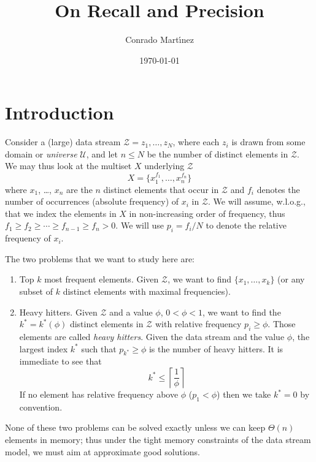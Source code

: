 \documentclass{article}
\title{On Recall and Precision}
\author{Conrado Mart{\'\i}nez} %
\date{\today}
\begin{document}
\maketitle

\section{Introduction}
Consider a (large) data stream $\mathcal{Z}=z_1,\ldots,z_N$, where each $z_i$ is
drawn from some domain or \emph{universe} $\mathcal{U}$, and let $n\le N$ 
be the number of distinct elements in $\mathcal{Z}$. We may thus look at 
the multiset $X$ underlying $\mathcal{Z}$
\[
X = \{x_1^{f_1},\ldots,x_n^{f_n}\}
\]
where $x_1$, \ldots, $x_n$ are the $n$ distinct elements that occur 
in $\mathcal{Z}$ and $f_i$ denotes the number of occurrences (absolute 
frequency) of $x_i$ in $\mathcal{Z}$.
We will assume, w.l.o.g., 
that we index the elements in $X$ in non-increasing order
of frequency, thus $f_1\ge f_2 \ge \cdots \ge f_{n-1} \ge f_n > 0$.
We will use $p_i = f_i/N$ to denote the relative frequency of $x_i$.

The two problems that we want to study here are:
\begin{enumerate}
\item Top $k$ most frequent elements. Given $\mathcal{Z}$, we want to find 
$\{x_1,\ldots,x_k\}$ (or any subset of $k$ distinct elements
with maximal frequencies). 
\item Heavy hitters. Given $\mathcal{Z}$ and a value $\phi$, $0 < \phi < 1$, 
  we want to find the $k^\ast=k^\ast(\phi)$ distinct elements
  in $\mathcal{Z}$ with relative frequency $p_i \ge \phi$.
Those elements are called \emph{heavy hitters}. 
Given the data stream and the value $\phi$, 
the largest index $k^\ast$ such that $p_{k^\ast} \ge \phi$ is the number
of heavy hitters. It is immediate to see that
\[
k^\ast\le\left\lceil\frac{1}{\phi}\right\rceil
\]
If no element has relative frequency above $\phi$ ($p_1 < \phi$) then we
take $k^\ast=0$ by convention.
\end{enumerate}
None of these two problems can be solved exactly unless we can 
keep $\Theta(n)$ elements in memory; thus under the tight memory constraints
of the data stream model, we must aim at approximate good solutions.
\end{document}
